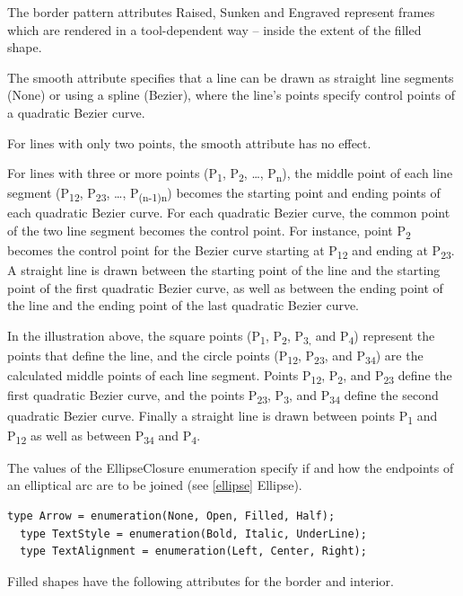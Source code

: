 \documentclass[10pt,a4paper]{report}
\begin{document}
The border pattern attributes Raised, Sunken and Engraved represent frames
which are rendered in a tool-dependent way -- inside the extent of the
filled shape.

The smooth attribute specifies that a line can be drawn as straight line
segments (None) or using a spline (Bezier), where the line's points
specify control points of a quadratic Bezier curve.

For lines with only two points, the smooth attribute has no effect.

For lines with three or more points (P\textsubscript{1},
P\textsubscript{2}, \ldots{}, P\textsubscript{n}), the middle point of
each line segment (P\textsubscript{12}, P\textsubscript{23}, \ldots{},
P\textsubscript{(n-1)n}) becomes the starting point and ending points of
each quadratic Bezier curve. For each quadratic Bezier curve, the common
point of the two line segment becomes the control point. For instance,
point P\textsubscript{2} becomes the control point for the Bezier curve
starting at P\textsubscript{12} and ending at P\textsubscript{23}. A
straight line is drawn between the starting point of the line and the
starting point of the first quadratic Bezier curve, as well as between
the ending point of the line and the ending point of the last quadratic
Bezier curve.

In the illustration above, the square points (P\textsubscript{1},
P\textsubscript{2}, P\textsubscript{3,} and P\textsubscript{4})
represent the points that define the line, and the circle points
(P\textsubscript{12}, P\textsubscript{23}, and P\textsubscript{34}) are
the calculated middle points of each line segment. Points
P\textsubscript{12}, P\textsubscript{2}, and P\textsubscript{23} define
the first quadratic Bezier curve, and the points P\textsubscript{23},
P\textsubscript{3}, and P\textsubscript{34} define the second quadratic
Bezier curve. Finally a straight line is drawn between points
P\textsubscript{1} and P\textsubscript{12} as well as between
P\textsubscript{34} and P\textsubscript{4}.

The values of the EllipseClosure enumeration specify if and how the
endpoints of an elliptical arc are to be joined (see \ref{ellipse} Ellipse).

\begin{lstlisting}[language=modelica]
  type Arrow = enumeration(None, Open, Filled, Half);
  type TextStyle = enumeration(Bold, Italic, UnderLine);
  type TextAlignment = enumeration(Left, Center, Right);
\end{lstlisting}
Filled shapes have the following attributes for the border and interior.
\end{document}
